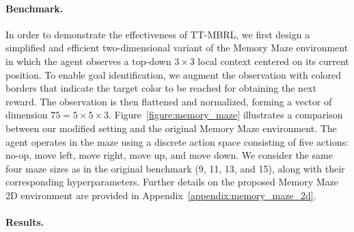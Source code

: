 \paragraph{Benchmark.}

In order to demonstrate the effectiveness of TT-MBRL, we first design a simplified and efficient two-dimensional variant of the Memory Maze environment in which the agent observes a top-down $3 \times 3$ local context centered on its current position. To enable goal identification, we augment the observation with colored borders that indicate the target color to be reached for obtaining the next reward. The observation is then flattened and normalized, forming a vector of dimension $75=5\times5\times3$. Figure~\ref{figure:memory_maze} illustrates a comparison between our modified setting and the original Memory Maze environment. The agent operates in the maze using a discrete action space consisting of five actions: no-op, move left, move right, move up, and move down. We consider the same four maze sizes as in the original benchmark (9, 11, 13, and 15), along with their corresponding hyperparameters. Further details on the proposed Memory Maze 2D environment are provided in Appendix~\ref{appendix:memory_maze_2d}.




\paragraph{Results.}

